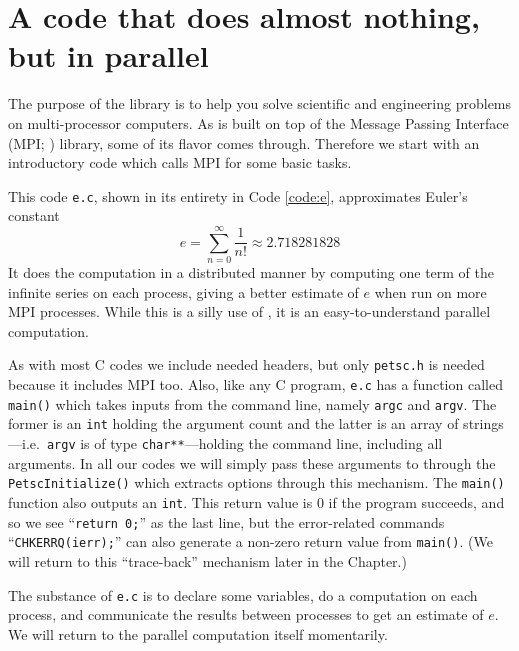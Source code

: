 
\section{A code that does almost nothing, but in parallel}

The purpose of the \PETSc library is to help you solve scientific and engineering problems on multi-processor computers.  As \PETSc is built on top of the Message Passing Interface (MPI; \citep{Groppetal1999}) library, some of its flavor comes through.  Therefore we start with an introductory \PETSc code which calls MPI for some basic tasks.

This code \texttt{e.c}, shown in its entirety in Code \ref{code:e}, approximates Euler's constant
\begin{equation}
e = \sum_{n = 0}^\infty \frac{1}{n!} \approx 2.718281828 \label{introeseries}
\end{equation}
It does the computation in a distributed manner by computing one term of the infinite series on each process, giving a better estimate of $e$ when run on more MPI processes. While this is a silly use of \PETSc, it is an easy-to-understand parallel computation.

As with most C codes we include needed headers, but only \texttt{petsc.h} is needed because it includes MPI too.  Also, like any C program, \texttt{e.c} has a function called \texttt{main()} which takes inputs from the command line, namely \texttt{argc} and \texttt{argv}.  The former is an \texttt{int} holding the argument count and the latter is an array of strings---i.e.~\texttt{argv} is of type \texttt{char**}---holding the command line, including all arguments.  In all our codes we will simply pass these arguments to \PETSc through the \texttt{PetscInitialize()} which extracts options through this mechanism.  The \texttt{main()} function also outputs an \texttt{int}.  This return value is $0$ if the program succeeds, and so we see ``\texttt{return 0;}'' as the last line, but the error-related commands ``\texttt{CHKERRQ(ierr);}'' can also generate a non-zero return value from \texttt{main()}.  (We will return to this ``trace-back'' mechanism later in the Chapter.)

The substance of \texttt{e.c} is to declare some variables, do a computation on each process, and communicate the results between processes to get an estimate of $e$.  We will return to the parallel computation itself momentarily.


